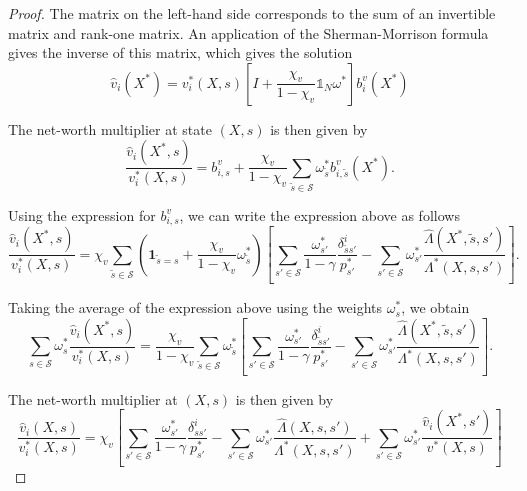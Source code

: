 \begin{proof}
The matrix on the left-hand side corresponds to the sum of an invertible matrix and rank-one matrix. An application of the Sherman-Morrison formula gives the inverse of this matrix, which gives the solution
\begin{equation}
    \hat{v}_i(X^*) = v_i^*(X,s)\left[ I + \frac{\chi_v}{1-\chi_v } \mathbb{1}_N \omega^* \right]b_{i}^v(X^*)
\end{equation}

The net-worth multiplier at state $(X,s)$ is then given by
\begin{equation}
    \frac{\hat{v}_i(X^*,s)}{v_i^*(X,s)} = b_{i,s}^v + \frac{\chi_v}{1-\chi_v} \sum_{\tilde{s} \in \mathcal{S}}\omega_{\tilde{s}}^* b_{i,\tilde{s}}^v(X^*).
\end{equation}


Using the expression for $b_{i,s}^v$, we can write the expression above as follows
\begin{equation}
  \frac{\hat{v}_i(X^*,s)}{v_i^*(X,s)} =  \chi_v \sum_{\tilde{s}\in \mathcal{S}}\left(\mathbf{1}_{\tilde{s} =s} + \frac{\chi_v}{1-\chi_v} \omega^*_{\tilde{s}} \right) \left[ \sum_{s'\in \mathcal{S}} \frac{ \omega^*_{s'}}{1-\gamma} \frac{\delta_{\tilde{s}s'}^i}{p_{s'}^*} -\sum_{s'\in \mathcal{S}} \omega_{s'}^* \frac{\hat{\Lambda}(X^*,\tilde{s},s')}{\Lambda^*(X,s,s')}  \right].
\end{equation}

Taking the average of the expression above using the weights $\omega^*_s$, we obtain
\begin{equation}
  \sum_{s\in\mathcal{S}} \omega_s^*\frac{\hat{v}_i(X^*,s)}{v_i^*(X,s)} =  \frac{ \chi_v }{1-\chi_v}\sum_{\tilde{s}\in \mathcal{S}}  \omega^*_{\tilde{s}} \left[ \sum_{s'\in \mathcal{S}} \frac{ \omega^*_{s'}}{1-\gamma} \frac{\delta_{\tilde{s}s'}^i}{p_{s'}^*} -\sum_{s'\in \mathcal{S}} \omega_{s'}^* \frac{\hat{\Lambda}(X^*,\tilde{s},s')}{\Lambda^*(X,s,s')}  \right].
\end{equation}

The net-worth multiplier at $(X,s)$ is then given by
\begin{equation}
    \frac{\hat{v}_i(X,s)}{v_i^*(X,s)}  =  \chi_v \left[ \sum_{s'\in \mathcal{S}} \frac{\omega^*_{s'}}{1-\gamma} \frac{\delta_{ss'}^i}{p_{s'}^*} -\sum_{s'\in \mathcal{S}} \omega_{s'}^* \frac{\hat{\Lambda}(X,s,s')}{\Lambda^*(X,s,s')} +\sum_{s'\in \mathcal{S}} \omega^*_{s'} \frac{\hat{v}_i(X^*,s')}{v^*(X,s)} \right]
\end{equation}


\end{proof}
